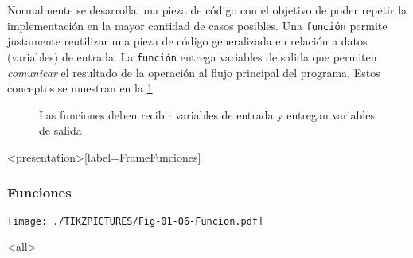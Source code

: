 
Normalmente se desarrolla una pieza de código con el objetivo
de poder repetir la implementación en la mayor cantidad de casos
posibles. Una \texttt{función} permite justamente reutilizar
una pieza de código generalizada en relación a datos (variables) de
entrada. La \texttt{función} entrega variables de salida que permiten
\emph{comunicar} el resultado de la operación al flujo principal
del programa. Estos conceptos se muestran en la \ref{FigFrameFunciones}

\begin{figure}

  \caption{ Las funciones deben recibir variables de entrada
  y entregan variables de salida \protect\label{FigFrameFunciones} }

\end{figure}

\mode*
\begin{frame}<presentation>[label=FrameFunciones]
  \frametitle{Funciones}
    \texttt{[image: ./TIKZPICTURES/Fig-01-06-Funcion.pdf]}

\end{frame}
\mode<all>
